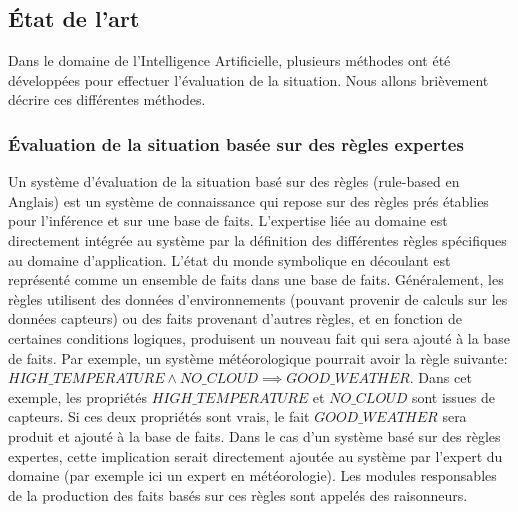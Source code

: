 \documentclass[a4paper,11pt,twoside]{StyleThese}
\begin{document}


\subsection{État de l'art}

Dans le domaine de l'Intelligence Artificielle, plusieurs méthodes ont été développées pour effectuer l'évaluation de la situation. Nous allons brièvement décrire ces différentes méthodes.

\subsubsection{Évaluation de la situation basée sur des règles expertes}
Un système d'évaluation de la situation basé sur des règles (rule-based en Anglais) est un système de connaissance qui repose sur des règles prés établies pour l'inférence et sur une base de faits. L'expertise liée au domaine est directement intégrée au système par la définition des différentes règles spécifiques au domaine d'application. L'état du monde symbolique en découlant est représenté comme un ensemble de faits dans une base de faits.
Généralement, les règles utilisent des données d'environnements (pouvant provenir de calculs sur les données capteurs) ou des faits provenant d'autres règles, et en fonction de certaines conditions logiques, produisent un nouveau fait qui sera ajouté à la base de faits. 
Par exemple, un système météorologique pourrait avoir la règle suivante: \newline
$HIGH\_TEMPERATURE \land NO\_CLOUD \implies GOOD\_WEATHER$. \newline
Dans cet exemple, les propriétés $HIGH\_TEMPERATURE$ et $NO\_CLOUD$ sont issues de capteurs. Si ces deux propriétés sont vrais, le fait $GOOD\_WEATHER$ sera produit et ajouté à la base de faits. Dans le cas d'un système basé sur des règles expertes, cette implication serait directement ajoutée au système par l'expert du domaine (par exemple ici un expert en météorologie). 
Les modules responsables de la production des faits basés sur ces règles sont appelés des raisonneurs.
\end{document}
